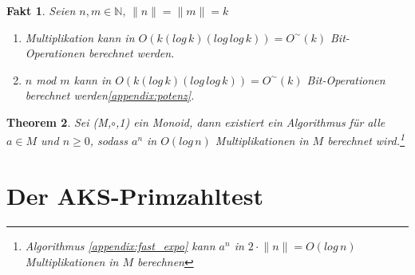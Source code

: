 \documentclass[12pt,oneside]{article}
\newtheorem{theorem}{Theorem}[section]
\newtheorem{fact}[theorem]{Fakt}
\theoremstyle{remark}
\theoremstyle{definition}
\begin{document}
\begin{fact}\label{fact_2}
Seien $n,m \in \mathbb{N}, \, \lVert n \rVert = \lVert m \rVert =k$
\begin{enumerate}
    \item Multiplikation kann in $O(k (log \, k)(log \, log \, k)) = O^{\sim}(k)$ Bit-Operationen berechnet werden.\newline
    \item $n$ mod $m$ kann in $O(k (log \, k)(log \, log \, k)) = O^{\sim}(k)$ Bit-Operationen berechnet werden\ref{appendix:potenz}.\newline
\end{enumerate}
\end{fact}
\begin{theorem}\label{poly_mult}
Sei (M,$\circ$,1) ein Monoid, dann existiert ein Algorithmus für alle $a \in  M$ und $n \geq 0$, sodass $a^n$ in $O(log \, n)$ Multiplikationen in $M$ berechnet wird.\footnote{Algorithmus \ref{appendix:fast_expo} kann $a^n$ in $2\cdot \lVert n \rVert = O(log \, n)$ Multiplikationen in $M$ berechnen}
\end{theorem}


\newpage

\section{Der AKS-Primzahltest}
\end{document}
